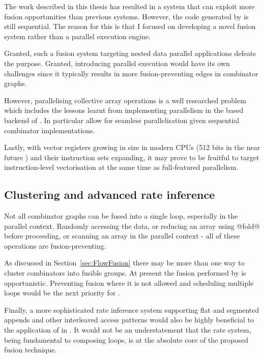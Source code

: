 \documentclass[preamble.tex]{subfiles}
\begin{document}
The work described in this thesis has resulted in a system that can exploit more fusion opportunities than previous systems. However, the code generated by \LiveFusion is still sequential. The reason for this is that I focused on developing a novel fusion system rather than a parallel execution engine.

Granted, such a fusion system targeting nested data parallel applications defeats the purpose. Granted, introducing parallel execution would have its own challenges since it typically results in more fusion-preventing edges in combinator graphs.

However, parallelising collective array operations is a well researched problem which includes the lessons learnt from implementing parallelism in the \StreamFusion based backend of \DPH. In particular  \cite{CLP+07} allow for seamless parallelisation given sequential combinator implementations.

Lastly, with vector registers growing in size in modern CPUs (512 bits in the near future \cite{IntelISA}) and their instruction sets expanding, it may prove to be fruitful to target instruction-level vectorisation at the same time as full-featured parallelism.



\subsection{Clustering and advanced rate inference}

Not all combinator graphs can be fused into a single loop, especially in the parallel context. Randomly accessing the data, or reducing an array using @fold@ before proceeding, or scanning an array in the parallel context - all of these operations are fusion-preventing.

As discussed in Section~\ref{sec:FlowFusion} there may be more than one way to cluster combinators into fusible groups. At present the fusion performed by \LiveFusion is opportunistic. Preventing fusion where it is not allowed and scheduling multiple loops would be the next priority for \LiveFusion.

Finally, a more sophisticated rate inference system supporting flat and segmented appends and other interleaved access patterns would also be highly beneficial to the application of \LiveFusion in \DPH. It would not be an understatement that the rate system, being fundamental to composing loops, is at the absolute core of the proposed fusion technique.






\IfNotCompilingAll{}
\end{document}
